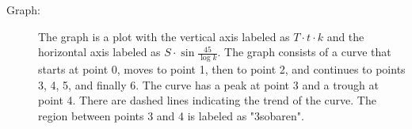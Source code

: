 

\item[a)] 
    \begin{description}
        \item[Graph:] 
        The graph is a plot with the vertical axis labeled as $T \cdot t \cdot k$ and the horizontal axis labeled as $S \cdot \sin \frac{45}{\log k}$. The graph consists of a curve that starts at point 0, moves to point 1, then to point 2, and continues to points 3, 4, 5, and finally 6. The curve has a peak at point 3 and a trough at point 4. There are dashed lines indicating the trend of the curve. The region between points 3 and 4 is labeled as "3sobaren".
    \end{description}